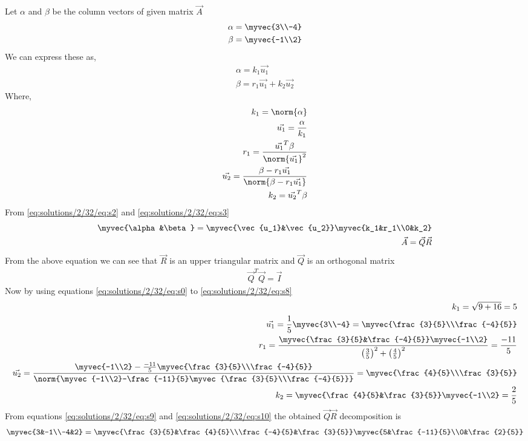 Let $\alpha$ and $\beta$ be the column vectors of given matrix $\vec{A}$
\begin{align}
\alpha = \myvec{3\\-4}\label{eq:solutions/2/32/eq:s0}\\
\beta = \myvec{-1\\2}\label{eq:solutions/2/32/eq:s1}
\end{align}
We can express these as,
\begin{align}
\alpha = k_1\vec{u_1}\label{eq:solutions/2/32/eq:s2}\\
\beta = r_1\vec{u_1} +k_2\vec{u_2}\label{eq:solutions/2/32/eq:s3}
\end{align}
Where,
\begin{align}
k_1 = \norm{\alpha}\label{eq:solutions/2/32/eq:s4}\\
\vec{u_1} =\frac{\alpha}{k_1}\label{eq:solutions/2/32/eq:s5}\\
r_1 = \frac{\vec{u_1}^T\beta}{\norm{\vec{u_1}}^2}\label{eq:solutions/2/32/eq:s6}\\
\vec{u_2} = \frac{\beta-r_1\vec{u_1}}{\norm{\beta-r_1\vec{u_1}}}\label{eq:solutions/2/32/eq:s7}\\
k_2 = \vec{u_2}^T\beta\label{eq:solutions/2/32/eq:s8}
\end{align}
From \eqref{eq:solutions/2/32/eq:s2} and \eqref{eq:solutions/2/32/eq:s3}
\begin{align}
\myvec{\alpha&\beta} = \myvec{\vec{u_1}&\vec{u_2}}\myvec{k_1&r_1\\0&k_2}\label{eq:solutions/2/32/eq:s9}\\
\vec{A}=\vec{Q}\vec{R}\label{eq:solutions/2/32/eq:s10}
\end{align}
From the above equation we can see that $\vec{R}$ is an upper triangular matrix and $\vec{Q}$ is an orthogonal matrix
\begin{align}
\vec{Q}^T\vec{Q} = \vec{I}
\end{align}
Now by using equations \eqref{eq:solutions/2/32/eq:s0} to \eqref{eq:solutions/2/32/eq:s8}
\begin{align}
k_1 = \sqrt{9+16} = 5\label{eq:solutions/2/32/eq:s11}\\
\vec{u_1} = \frac{1}{5}\myvec{3\\-4} = \myvec{\frac{3}{5}\\\frac{-4}{5}}\\
r_1 = \frac{\myvec{\frac{3}{5}&\frac{-4}{5}}\myvec{-1\\2}}{\left(\frac{3}{5}\right)^2+\left(\frac{4}{5}\right)^2}=\frac{-11}{5}\\
\vec{u_2} = \frac{\myvec{-1\\2}-\frac{-11}{5}\myvec{\frac{3}{5}\\\frac{-4}{5}}}{\norm{\myvec{-1\\2}-\frac{-11}{5}\myvec{\frac{3}{5}\\\frac{-4}{5}}}} = \myvec{\frac{4}{5}\\\frac{3}{5}}\\
k_2 = \myvec{\frac{4}{5}&\frac{3}{5}}\myvec{-1\\2} = \frac{2}{5}
\end{align}
From equations \eqref{eq:solutions/2/32/eq:s9} and \eqref{eq:solutions/2/32/eq:s10}
the obtained $\vec{Q}\vec{R}$ decomposition is
\begin{align}
\myvec{3&-1\\-4&2} = \myvec{\frac{3}{5}&\frac{4}{5}\\\frac{-4}{5}&\frac{3}{5}}\myvec{5&\frac{-11}{5}\\0&\frac{2}{5}}
\end{align}
